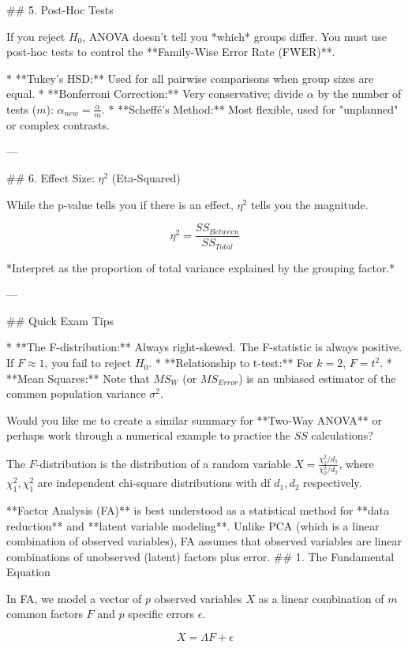 ## 5. Post-Hoc Tests

If you reject $H_0$, ANOVA doesn't tell you *which* groups differ. You must use post-hoc tests to control the **Family-Wise Error Rate (FWER)**.

* **Tukey’s HSD:** Used for all pairwise comparisons when group sizes are equal.
* **Bonferroni Correction:** Very conservative; divide $\alpha$ by the number of tests ($m$): $\alpha_{new} = \frac{\alpha}{m}$.
* **Scheffé’s Method:** Most flexible, used for "unplanned" or complex contrasts.

---

## 6. Effect Size: $\eta^2$ (Eta-Squared)

While the p-value tells you if there is an effect, $\eta^2$ tells you the magnitude.


$$\eta^2 = \frac{SS_{Between}}{SS_{Total}}$$


*Interpret as the proportion of total variance explained by the grouping factor.*

---

## Quick Exam Tips

* **The F-distribution:** Always right-skewed. The F-statistic is always positive. If $F \approx 1$, you fail to reject $H_0$.
* **Relationship to t-test:** For $k=2$, $F = t^2$.
* **Mean Squares:** Note that $MS_W$ (or $MS_{Error}$) is an unbiased estimator of the common population variance $\sigma^2$.

Would you like me to create a similar summary for **Two-Way ANOVA** or perhaps work through a numerical example to practice the $SS$ calculations?

The \( F \)-distribution is the distribution of a random variable
\( X = \frac{\chi^2_1 / d_1}{\chi^2_2 / d_2} \), where \( \chi^2_{1}, \chi^2_{1} \) are independent chi-square distributions with df \( d_1, d_2 \) respectively.



**Factor Analysis (FA)** is best understood as a statistical method for **data reduction** and **latent variable modeling**. 
Unlike PCA (which is a linear combination of observed variables), FA assumes that observed variables are linear combinations of unobserved (latent) factors plus error.
## 1. The Fundamental Equation

In FA, we model a vector of $p$ observed variables $X$ as a linear combination of $m$ common factors $F$ and $p$ specific errors $\epsilon$.

$$X = \Lambda F + \epsilon$$

